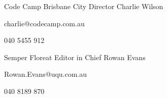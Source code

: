 


\begin{cventries}


\cventry
{Code Camp Brisbane City Director} %
{Charlie Wilson} %
{} %
{} %
{ %
\begin{cvitems}
\item charlie@codecamp.com.au
\item 040 5455 912
\end{cvitems}
}


\cventry
{Semper Floreat Editor in Chief} %
{Rowan Evans} %
{} %
{} %
{ %
\begin{cvitems}
\item Rowan.Evans@uqu.com.au
\item 040 8189 870
\end{cvitems}
}


\end{cventries}